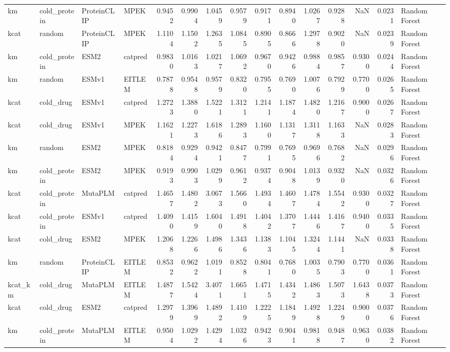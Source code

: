 \begin{tabular}{llllrrrrrrrrrrl}
km & cold_protein & ProteinCLIP & MPEK & 0.9452 & 0.9904 & 1.0459 & 0.9579 & 0.9171 & 0.8940 & 1.0267 & 0.9288 & NaN & 0.0231 & Random Forest \\
kcat & random & ProteinCLIP & MPEK & 1.1104 & 1.1502 & 1.2635 & 1.0845 & 0.8905 & 0.8666 & 1.2978 & 0.9020 & NaN & 0.0239 & Random Forest \\
km & cold_protein & ESM2 & catpred & 0.9830 & 1.0163 & 1.0217 & 1.0692 & 0.9670 & 0.9426 & 0.9884 & 0.9857 & 0.9300 & 0.0244 & Random Forest \\
km & random & ESMv1 & EITLEM & 0.7878 & 0.9548 & 0.9579 & 0.8320 & 0.7955 & 0.7690 & 1.0076 & 0.7929 & 0.7700 & 0.0265 & Random Forest \\
kcat & cold_drug & ESMv1 & catpred & 1.2723 & 1.3880 & 1.5221 & 1.3121 & 1.2141 & 1.1874 & 1.4820 & 1.2167 & 0.9000 & 0.0267 & Random Forest \\
kcat & cold_drug & ESMv1 & MPEK & 1.1621 & 1.2273 & 1.6186 & 1.2893 & 1.1600 & 1.1317 & 1.3118 & 1.1633 & NaN & 0.0283 & Random Forest \\
km & random & ESM2 & MPEK & 0.8184 & 0.9294 & 0.9421 & 0.8477 & 0.7991 & 0.7695 & 0.9696 & 0.7682 & NaN & 0.0296 & Random Forest \\
km & cold_protein & ESM2 & MPEK & 0.9193 & 0.9903 & 1.0299 & 0.9612 & 0.9374 & 0.9048 & 1.0139 & 0.9320 & NaN & 0.0326 & Random Forest \\
kcat & cold_protein & MutaPLM & catpred & 1.4657 & 1.4802 & 3.0673 & 1.5660 & 1.4934 & 1.4607 & 1.4784 & 1.5542 & 0.9300 & 0.0327 & Random Forest \\
kcat & cold_protein & ESMv1 & catpred & 1.4090 & 1.4159 & 1.6040 & 1.4918 & 1.4042 & 1.3707 & 1.4446 & 1.4167 & 0.9400 & 0.0335 & Random Forest \\
kcat & cold_drug & ESM2 & MPEK & 1.2068 & 1.2266 & 1.4986 & 1.3436 & 1.1383 & 1.1045 & 1.3244 & 1.1441 & NaN & 0.0338 & Random Forest \\
km & random & ProteinCLIP & EITLEM & 0.8532 & 0.9622 & 1.0191 & 0.8528 & 0.8041 & 0.7680 & 1.0035 & 0.7903 & 0.7700 & 0.0361 & Random Forest \\
kcat_km & cold_drug & MutaPLM & EITLEM & 1.4877 & 1.5424 & 3.4071 & 1.6651 & 1.4715 & 1.4342 & 1.4863 & 1.5073 & 1.6438 & 0.0373 & Random Forest \\
kcat & cold_drug & ESM2 & catpred & 1.2979 & 1.3969 & 1.4892 & 1.4109 & 1.2225 & 1.1849 & 1.4928 & 1.2249 & 0.9000 & 0.0376 & Random Forest \\
km & cold_protein & MutaPLM & EITLEM & 0.9504 & 1.0292 & 1.4294 & 1.0326 & 0.9423 & 0.9041 & 0.9818 & 0.9487 & 0.9630 & 0.0382 & Random Forest \\

\end{tabular}
